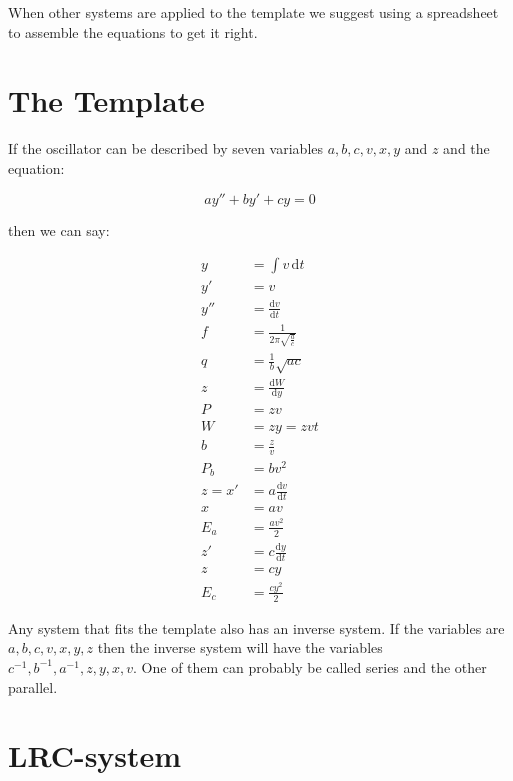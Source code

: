 \documentclass[]{../common/elementary-physics}
\begin{document}
When other systems are applied to the template we suggest using a spreadsheet to assemble the equations to get it right.

\pagebreak

\section{The Template}

If the oscillator can be described by seven variables $a,b,c,v,x,y$ and $z$ and the equation:

\begin{equation}
a y'' + b y' + c y = 0
\end{equation}

then we can say:

\begin{align}
y &= \int v \, \mathrm{d}t \\
y' &= v \\
y'' &= \frac{\mathrm{d}v}{\mathrm{d}t} \\
f &= \frac{1}{2 \pi \sqrt{\frac{a}{c}}} \tag{frequency} \\
q &= \frac{1}{b} \sqrt{a c} \tag{quality factor}\\
z &= \frac{\mathrm{d}W}{\mathrm{d}y} \\
P &= z v \tag{power} \\
W &= z y = z v t \tag{work} \\
b &= \frac{z}{v} \tag{parasite} \\
P_b &= b v^2 \tag{losses} \\
z = x' &= a \frac{\mathrm{d}v}{\mathrm{d}t} \\
x &= a v \\
E_a &= \frac{a v^2}{2} \tag{energy} \\
z' &= c \frac{\mathrm{d}y}{\mathrm{d}t} \\
z &= c y \\
E_c &= \frac{c y^2}{2} \tag{energy} 
\end{align}

Any system that fits the template also has an inverse system.
If the variables are $a,b,c,v,x,y,z$ then the inverse system will have the variables $c^{-1},b^{-1},a^{-1},z,y,x,v$.
One of them can probably be called series and the other parallel.

\pagebreak

\section{LRC-system}
\end{document}
